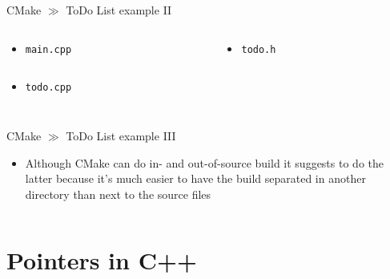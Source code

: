 \documentclass[10pt]{beamer}
\begin{document}
\begin{frame}{CMake $\gg$ ToDo List example II}
\begin{columns}
	\begin{column}{0.675\textwidth}
		\begin{itemize}
			\item \texttt{main.cpp}
			\inputminted[bgcolor=lightGreyCustom,fontsize=\scriptsize]{cpp}{./resources/CMake_ToDo_List/main.cpp}
			\item \texttt{todo.cpp}
			\inputminted[bgcolor=lightGreyCustom,fontsize=\scriptsize]{cpp}{./resources/CMake_ToDo_List/todo.cpp}
		\end{itemize}
	\end{column}
	\begin{column}{0.325\textwidth}
		\begin{itemize}
			\item \texttt{todo.h}
			\inputminted[bgcolor=lightGreyCustom,fontsize=\scriptsize]{cpp}{./resources/CMake_ToDo_List/todo.h}
		\end{itemize}
	\end{column}
\end{columns}
\end{frame}

\begin{frame}{CMake $\gg$ ToDo List example III}
\begin{itemize}
	\item Although CMake can do in- and out-of-source build it suggests to do the latter because it's much easier to have the build separated in another directory than next to the source files
	\inputminted[bgcolor=lightGreyCustom,fontsize=\scriptsize]{sh}{./resources/CMake_ToDo_List/createCmakeMakefile.sh}
\end{itemize}
\end{frame}

\section{Pointers in C++}
\end{document}
